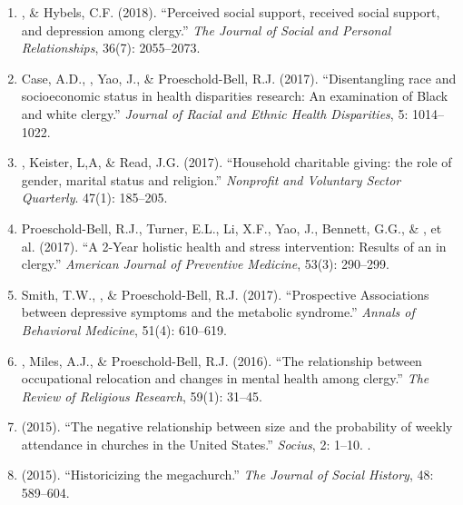 \begin{enumerate}
\item \Eagle, \& Hybels, C.F. (2018). ``Perceived social support, received social support, and depression among clergy.'' \emph{The Journal of Social and Personal Relationships}, 36(7): 2055--2073. 

\item Case, A.D., \Eagle, Yao, J., \& Proeschold-Bell, R.J. (2017). ``Disentangling race and socioeconomic status in health disparities research: An examination of Black and white clergy.'' \emph{Journal of Racial and Ethnic Health Disparities}, 5: 1014--1022. 

\item \Eagle, Keister, L,A, \& Read, J.G. (2017). ``Household charitable giving: the role of gender, marital status and religion.'' \emph{Nonprofit and Voluntary Sector Quarterly}. 47(1): 185--205. 

\item Proeschold-Bell, R.J., Turner, E.L., Li, X.F., Yao, J., Bennett, G.G., \& \Eagle, et al. (2017). ``A 2-Year holistic health and stress intervention: Results of an  in clergy.'' \emph{American Journal of Preventive Medicine}, 53(3): 290--299. 

\item Smith, T.W., \Eagle\CF, \& Proeschold-Bell, R.J. (2017). ``Prospective Associations between depressive symptoms and the metabolic syndrome.'' \emph{Annals of Behavioral Medicine}, 51(4): 610--619. 

\item \Eagle, Miles, A.J., \& Proeschold-Bell, R.J. (2016). ``The relationship between occupational relocation and changes in mental health among clergy.'' \emph{The Review of Religious Research}, 59(1): 31--45. 

\item \Eagle \hspace{.01em} (2015). ``The negative relationship between size and the probability of weekly attendance in churches in the United States.'' \emph{Socius}, 2: 1--10.  .

\item \Eagle \hspace{.01em} (2015). ``Historicizing the megachurch.'' \textit{The Journal of Social History}, 48: 589--604. 


\end{enumerate}
